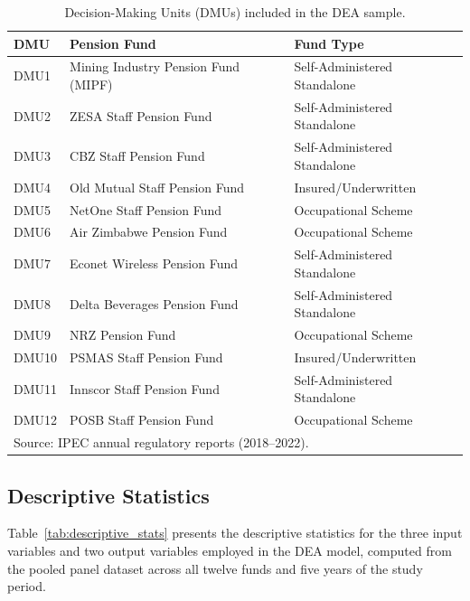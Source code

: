 \documentclass[12pt,a4paper]{article}
\begin{document}
\begin{table}[H]
\centering
\caption{Decision-Making Units (DMUs) included in the DEA sample.}
\label{tab:dmu_list}
\begin{tabular}{lll}
\toprule
\textbf{DMU} & \textbf{Pension Fund} & \textbf{Fund Type} \\
\midrule
DMU1  & Mining Industry Pension Fund (MIPF) & Self-Administered Standalone \\
DMU2  & ZESA Staff Pension Fund             & Self-Administered Standalone \\
DMU3  & CBZ Staff Pension Fund              & Self-Administered Standalone \\
DMU4  & Old Mutual Staff Pension Fund       & Insured/Underwritten \\
DMU5  & NetOne Staff Pension Fund           & Occupational Scheme \\
DMU6  & Air Zimbabwe Pension Fund           & Occupational Scheme \\
DMU7  & Econet Wireless Pension Fund        & Self-Administered Standalone \\
DMU8  & Delta Beverages Pension Fund        & Self-Administered Standalone \\
DMU9  & NRZ Pension Fund                    & Occupational Scheme \\
DMU10 & PSMAS Staff Pension Fund            & Insured/Underwritten \\
DMU11 & Innscor Staff Pension Fund          & Self-Administered Standalone \\
DMU12 & POSB Staff Pension Fund             & Occupational Scheme \\
\bottomrule
\multicolumn{3}{l}{\footnotesize Source: IPEC annual regulatory reports (2018--2022).}
\end{tabular}
\end{table}

\subsection{Descriptive Statistics}

Table~\ref{tab:descriptive_stats} presents the descriptive statistics for the three input variables and two output variables employed in the DEA model, computed from the pooled panel dataset across all twelve funds and five years of the study period.
\end{document}
